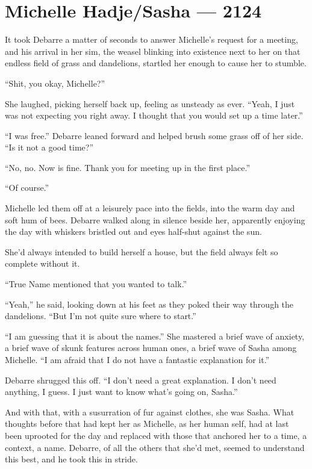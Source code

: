 \hypertarget{michelle-hadjesasha-2124}{%
\chapter{Michelle Hadje/Sasha — 2124}\label{michelle-hadjesasha-2124}}

It took Debarre a matter of seconds to answer Michelle's request for a meeting, and his arrival in her sim, the weasel blinking into existence next to her on that endless field of grass and dandelions, startled her enough to cause her to stumble.

``Shit, you okay, Michelle?''

She laughed, picking herself back up, feeling as unsteady as ever. ``Yeah, I just was not expecting you right away. I thought that you would set up a time later.''

``I was free.'' Debarre leaned forward and helped brush some grass off of her side. ``Is it not a good time?''

``No, no. Now is fine. Thank you for meeting up in the first place.''

``Of course.''

Michelle led them off at a leisurely pace into the fields, into the warm day and soft hum of bees. Debarre walked along in silence beside her, apparently enjoying the day with whiskers bristled out and eyes half-shut against the sun.

She'd always intended to build herself a house, but the field always felt so complete without it.

``True Name mentioned that you wanted to talk.''

``Yeah,'' he said, looking down at his feet as they poked their way through the dandelions. ``But I'm not quite sure where to start.''

``I am guessing that it is about the names.'' She mastered a brief wave of anxiety, a brief wave of skunk features across human ones, a brief wave of Sasha among Michelle. ``I am afraid that I do not have a fantastic explanation for it.''

Debarre shrugged this off. ``I don't need a great explanation. I don't need anything, I guess. I just want to know what's going on, Sasha.''

And with that, with a susurration of fur against clothes, she was Sasha. What thoughts before that had kept her as Michelle, as her human self, had at last been uprooted for the day and replaced with those that anchored her to a time, a context, a name. Debarre, of all the others that she'd met, seemed to understand this best, and he took this in stride.

